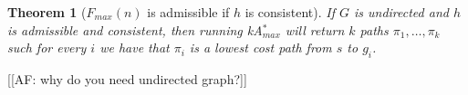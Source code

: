\documentclass{aicom2e}
\newtheorem{theorem}{Theorem}
\newcommand{\kastar}{kA$^*$}
\newcommand{\kastarmax}{kA$^*_{max}$}
\newcommand{\maxf}{$F_{max}(n)$}
\newcommand{\roni}[1]{\textbf{[RS:#1]}}
\begin{document}


\begin{theorem}[\maxf{} is admissible if $h$ is consistent]
If $G$ is undirected and $h$ is admissible and consistent, then running
\kastarmax{} will return $k$ paths $\pi_1,\ldots, \pi_k$ such for every $i$ we
have that $\pi_i$ is a lowest cost path from $s$ to $g_i$. \label{the:max-f}
\end{theorem}

[[AF: why do you need undirected graph?]]
\end{document}
